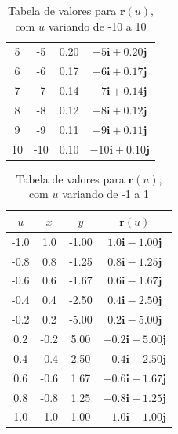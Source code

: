 \documentclass[a4paper,11pt,pagenumber=true]{article}
\theoremstyle{mytheor}
\begin{document}
\begin{table}[h]
\begin{tabular}{c|c|c|c}
                          5	& -5	&  0.20	&$-5\mathbf{i} +   0.20\mathbf{j}$\\
                          6	& -6	&  0.17	&$-6\mathbf{i} +   0.17\mathbf{j}$\\
                          7	& -7	&  0.14	&$-7\mathbf{i} +   0.14\mathbf{j}$\\
                          8	& -8	&  0.12	&$-8\mathbf{i} +   0.12\mathbf{j}$\\
                          9	& -9	&  0.11	&$-9\mathbf{i} +   0.11\mathbf{j}$\\
                         10	&-10	&  0.10	&$-10\mathbf{i} +   0.10\mathbf{j}$\\
                    \bottomrule
                \end{tabular}
                \caption{Tabela de valores para $\mathbf{r}(u)$, com $u$ variando de -10 a 10}
                \label{tab:21}
            \end{table} 
            
            \begin{table}[h]
                \centering
                \begin{tabular}{c|c|c|c}
                    \toprule
                        $u$	&$x$	&$y$	&$\mathbf{r}(u)$\\ \midrule
                        -1.0	&   1.0	& -1.00	&$   1.0\mathbf{i} -   1.00\mathbf{j}$\\
                         -0.8	&   0.8	& -1.25	&$   0.8\mathbf{i} -   1.25\mathbf{j}$\\
                         -0.6	&   0.6	& -1.67	&$   0.6\mathbf{i} -   1.67\mathbf{j}$\\
                         -0.4	&   0.4	& -2.50	&$   0.4\mathbf{i} -   2.50\mathbf{j}$\\
                         -0.2	&   0.2	& -5.00	&$   0.2\mathbf{i} -   5.00\mathbf{j}$\\
                          0.2	&  -0.2	&  5.00	&$  -0.2\mathbf{i} +   5.00\mathbf{j}$\\
                          0.4	&  -0.4	&  2.50	&$  -0.4\mathbf{i} +   2.50\mathbf{j}$\\
                          0.6	&  -0.6	&  1.67	&$  -0.6\mathbf{i} +   1.67\mathbf{j}$\\
                          0.8	&  -0.8	&  1.25	&$  -0.8\mathbf{i} +   1.25\mathbf{j}$\\
                          1.0	&  -1.0	&  1.00	&$  -1.0\mathbf{i} +   1.00\mathbf{j}$\\
                    \bottomrule
                \end{tabular}
                \caption{Tabela de valores para $\mathbf{r}(u)$, com $u$ variando de -1 a 1}
                \label{tab:22}
            \end{table}
            
\end{document}
